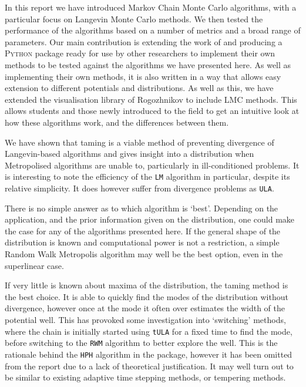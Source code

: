 In this report we have introduced Markov Chain Monte Carlo algorithms, with a particular focus on Langevin Monte Carlo methods. We then tested the performance of the algorithms based on a number of metrics and a broad range of parameters. Our main contribution is extending the work of \cite{Brosse18tULA} and producing a \textsc{Python} package ready for use by other researchers to implement their own methods to be tested against the algorithms we have presented here. As well as implementing their own methods, it is also written in a way that allows easy extension to different potentials and distributions. As well as this, we have extended the visualisation library of Rogozhnikov \cite{rogozhnikov2016hmc} to include LMC methods. This allows students and those newly introduced to the field to get an intuitive look at how these algorithms work, and the differences between them. 

We have shown that taming is a viable method of preventing divergence of Langevin-based algorithms and gives insight into a distribution when Metropolised algorithms are unable to, particularly in ill-conditioned problems. It is interesting to note the efficiency of the \texttt{LM} algorithm in particular, despite its relative simplicity. It does however suffer from divergence problems as \texttt{ULA}.

There is no simple answer as to which algorithm is `best'. Depending on the application, and the prior information given on the distribution, one could make the case for any of the algorithms presented here. If the general shape of the distribution is known and computational power is not a restriction, a simple Random Walk Metropolis algorithm may well be the best option, even in the superlinear case.

If very little is known about maxima of the distribution, the taming method is the best choice. It is able to quickly find the modes of the distribution without divergence, however once at the mode it often over estimates the width of the potential well.  This has provoked some investigation into `switching' methods, where the chain is initially started using \texttt{tULA} for a fixed time to find the mode, before switching to the \texttt{RWM} algorithm to better explore the well. This is the rationale behind the \texttt{HPH} algorithm in the package, however it has been omitted from the report due to a lack of theoretical justification. It may well turn out to be similar to existing adaptive time stepping methods, or tempering methods.

